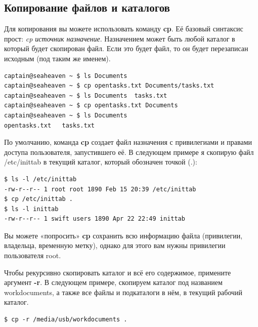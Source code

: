 \documentclass[10pt]{book}
\begin{document}
\subsection{Копирование файлов и каталогов}

Для копирования вы можете использовать команду \textbf{cp}. Её базовый синтаксис прост: \emph{cp источник назначение}. Назначением может быть любой каталог в который будет скопирован файл. Если это будет файл, то он будет перезаписан исходным (под таким же именем).

\vspace{3mm}
\begin{tcolorbox}
\begin{lstlisting}
captain@seaheaven ~ $ ls Documents
captain@seaheaven ~ $ cp opentasks.txt Documents/tasks.txt
captain@seaheaven ~ $ ls Documents 	tasks.txt
captain@seaheaven ~ $ cp opentasks.txt Documents
captain@seaheaven ~ $ ls Documents
opentasks.txt 	tasks.txt
\end{lstlisting}
\end{tcolorbox}

По умолчанию, команда \textbf{cp} создает файл назначения с привилегиами и правами доступа пользователя, запустившего её. В следующем примере я скопирую файл /etc/inittab в текущий каталог, который обозначен точкой (.):

\vspace{3mm}
\begin{tcolorbox}
\begin{lstlisting}
$ ls -l /etc/inittab
-rw-r--r-- 1 root root 1890 Feb 15 20:39 /etc/inittab
$ cp /etc/inittab .
$ ls -l inittab
-rw-r--r-- 1 swift users 1890 Apr 22 22:49 inittab
\end{lstlisting}
\end{tcolorbox}

Вы можете «попросить» \textbf{cp} сохранить всю информацию файла (привилегии, владельца, временную метку), однако для этого вам нужны привилегии пользователя root.

Чтобы рекурсивно скопировать каталог и всё его содержимое, примените аргумент \textbf{-r}. В следующем примере, скопируем каталог под названием workdocuments, а также все файлы и подкаталоги в нём, в текущий рабочий каталог.

\vspace{3mm}
\begin{tcolorbox}
\begin{lstlisting}
$ cp -r /media/usb/workdocuments .
\end{lstlisting}
\end{tcolorbox}
\end{document}
